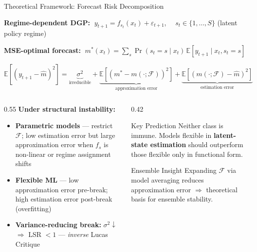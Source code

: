 \documentclass[aspectratio=169, 10pt]{beamer}
\begin{document}
\begin{frame}{Theoretical Framework: Forecast Risk Decomposition}

  \textbf{Regime-dependent DGP:} $\;y_{t+1} = f_{s_t}(x_t) + \varepsilon_{t+1}$, $\quad s_t \in \{1,\dots,S\}$ (latent policy regime)

  \vspace{4pt}
  \textbf{MSE-optimal forecast:} $\;m^*(x_t) = \sum_s \Pr(s_t{=}s \mid x_t)\,\mathbb{E}[y_{t+1} \mid x_t, s_t{=}s]$

  \vspace{4pt}
  \[
    \mathbb{E}\!\left[(y_{t+1}-\hat{m})^2\right]
    = \underbrace{\sigma^2}_{\text{irreducible}}
    + \underbrace{\mathbb{E}\!\left[(m^*-m(\cdot;\mathcal{F}))^2\right]}_{\text{approximation error}}
    + \underbrace{\mathbb{E}\!\left[(m(\cdot;\mathcal{F})-\hat{m})^2\right]}_{\text{estimation error}}
  \]

  \vspace{2pt}
  \begin{columns}[T]
    \begin{column}{0.55\textwidth}
      \textbf{Under structural instability:}
      \begin{itemize}\setlength\itemsep{4pt}
        \item \textbf{Parametric models} — restrict $\mathcal{F}$; low estimation error but \alert{large approximation error} when $f_s$ is non-linear or regime assignment shifts
        \item \textbf{Flexible ML} — low approximation error pre-break; high \alert{estimation error} post-break (overfitting)
        \item \textbf{Variance-reducing break:} $\sigma^2\!\downarrow$ $\Rightarrow$ LSR $<1$ — \emph{inverse} Lucas Critique
      \end{itemize}
    \end{column}
    \begin{column}{0.42\textwidth}
      \begin{block}{Key Prediction}
        Neither class is immune. Models flexible in \textbf{latent-state estimation} should outperform those flexible only in functional form.
      \end{block}
      \vspace{4pt}
      \begin{block}{Ensemble Insight}
        Expanding $\mathcal{F}$ via model averaging reduces approximation error $\Rightarrow$ theoretical basis for ensemble stability.
      \end{block}
    \end{column}
  \end{columns}

\end{frame}
\end{document}
